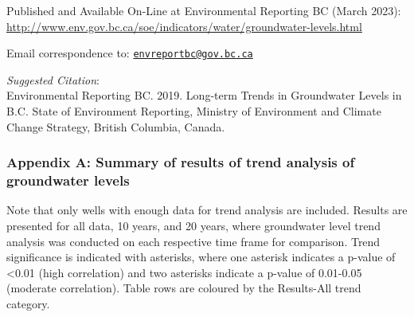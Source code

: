 \documentclass[
]{article}
\begin{document}
Published and Available On-Line at Environmental Reporting BC (March
2023):
\url{http://www.env.gov.bc.ca/soe/indicators/water/groundwater-levels.html}

Email correspondence to:
\href{mailto:envreportbc@gov.bc.ca}{\nolinkurl{envreportbc@gov.bc.ca}}

\emph{Suggested Citation}:\\
Environmental Reporting BC. 2019. Long-term Trends in Groundwater Levels
in B.C. State of Environment Reporting, Ministry of Environment and
Climate Change Strategy, British Columbia, Canada.

\newpage

\hypertarget{appendix-a-summary-of-results-of-trend-analysis-of-groundwater-levels}{%
\subsubsection{Appendix A: Summary of results of trend analysis of
groundwater
levels}\label{appendix-a-summary-of-results-of-trend-analysis-of-groundwater-levels}}

Note that only wells with enough data for trend analysis are included.
Results are presented for all data, 10 years, and 20 years, where
groundwater level trend analysis was conducted on each respective time
frame for comparison. Trend significance is indicated with asterisks,
where one asterisk indicates a p-value of \textless0.01 (high
correlation) and two asterisks indicate a p-value of 0.01-0.05 (moderate
correlation). Table rows are coloured by the Results-All trend category.
\end{document}
